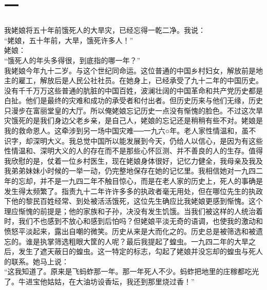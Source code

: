 \fancyhead[RO]{\thepage} %
\fancyhead[LE]{\thepage} %
\fancyfoot[LE,RO]{}
\fancyfoot[LO,CE]{}
\fancyfoot[CO,RE]{}
\chapter*{一}
我姥娘将五十年前饿死人的大旱灾，已经忘得一乾二净。我说：\\

“姥娘，五十年前，大旱，饿死许多人！”\\

姥娘：\\

“饿死人的年头多得很，到底指的哪一年？”\\

我姥娘今年九十二岁。与这个世纪同命运。这位普通的中国乡村妇女，解放前是地主的雇工，解放后是人民公社社员。在她身上，已经承受了九十二年的中国历史。没有千千万万这些普通的肮脏的中国百姓，波澜壮阔的中国革命和共产党历史都是白扯。他们是最终的灾难和成功的承受者和付出者。但历史历来与他们无缘，历史只漫步在富丽堂皇的大厅。所以俺姥娘忘记历史一点没有惭愧的脸色。不过这次旱灾饿死的是我们身边父老乡亲，是自己人，姥娘的忘记还是稍稍有些不对。姥娘是我的救命恩人。这牵涉到另一场中国灾难──一九六○年。老人家性情温和，虽不识字，却深明大义。我总觉中国所以能发展到今天，仍给人以信心，是因为有这些性情温和、深明大义的人的存在而不是那些心怀叵测、并不善良的人的生存。值得我欣慰的是，仗着一位乡村医生，现在姥娘身体很好，记忆力健全，我母亲及我及我弟弟妹妹小时候的一举一动，仍完整地保存在她的记忆里。我相信她对一九四二年的忘却，并不是一九四二年不触目惊心，而是在老人家的历史上，死人的事确是发生得太频繁了。指责九十二年许许多多的执政者毫无用处，但在哪位先生的执政下他的黎民百姓经常、到处被活活饿死，这位先生确应比我姥娘更感到惭愧。这个理应惭愧的前提是；他的家族和子孙，决没有发生饥饿。当我们被这样的人统治着时，我们不也感到不放心和感到后怕吗？但姥娘平淡无奇的语调，也使我的激动和愤怒平淡起来，露出自嘲的微笑。历史从来是大而化之的。历史总是被筛选和被遗忘的。谁是执掌筛选粗眼大筐的人呢？最后我提起了蝗虫。一九四二年的大旱之后，发生了遮天蔽日的蝗虫。这一特定的标志，勾起了姥娘并没忘却的蝗虫与死人的联系。她马上说：\\

“这我知道了。原来是飞蚂蚱那一年。那一年死人不少。蚂蚱把地里的庄稼都吃光了。牛进宝他姑姑，在大油坊设香坛，我还到那里烧过香！”\\

